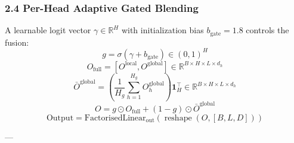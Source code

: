 \subsubsection{2.4 Per-Head Adaptive Gated Blending}

A learnable logit vector $\gamma \in \mathbb{R}^H$ with initialization bias $b_{\text{gate}} = 1.8$ controls the fusion:$$g = \sigma(\gamma + b_{\text{gate}}) \in (0, 1)^H$$$$O_{\text{full}} = [O^{\text{local}}, O^{\text{global}}] \in \mathbb{R}^{B \times H \times L \times d_h}$$$$\bar{O}^{\text{global}} = \left(\frac{1}{H_g} \sum_{h=1}^{H_g} O^{\text{global}}_h\right) \mathbf{1}_H^\top \in \mathbb{R}^{B \times H \times L \times d_h}$$$$O = g \odot O_{\text{full}} + (1 - g) \odot \bar{O}^{\text{global}}$$$$\text{Output} = \text{FactorisedLinear}_{\text{out}}(\operatorname{reshape}(O, [B, L, D]))$$

---